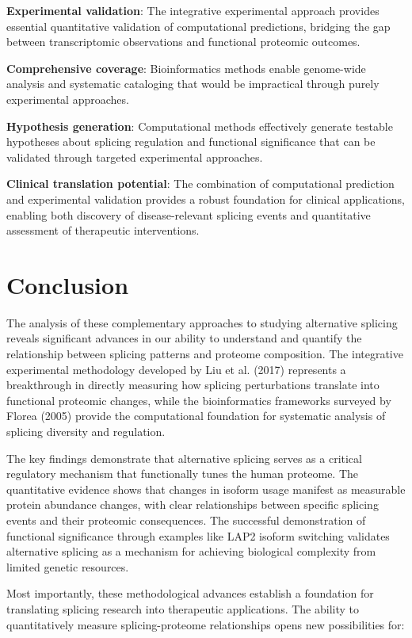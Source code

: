 \documentclass[12pt,a4paper]{article}
\begin{document}
\textbf{Experimental validation}: The integrative experimental approach provides essential quantitative validation of computational predictions, bridging the gap between transcriptomic observations and functional proteomic outcomes.

\textbf{Comprehensive coverage}: Bioinformatics methods enable genome-wide analysis and systematic cataloging that would be impractical through purely experimental approaches.

\textbf{Hypothesis generation}: Computational methods effectively generate testable hypotheses about splicing regulation and functional significance that can be validated through targeted experimental approaches.

\textbf{Clinical translation potential}: The combination of computational prediction and experimental validation provides a robust foundation for clinical applications, enabling both discovery of disease-relevant splicing events and quantitative assessment of therapeutic interventions.

\section{Conclusion}

The analysis of these complementary approaches to studying alternative splicing reveals significant advances in our ability to understand and quantify the relationship between splicing patterns and proteome composition. The integrative experimental methodology developed by Liu et al. (2017) represents a breakthrough in directly measuring how splicing perturbations translate into functional proteomic changes, while the bioinformatics frameworks surveyed by Florea (2005) provide the computational foundation for systematic analysis of splicing diversity and regulation.

The key findings demonstrate that alternative splicing serves as a critical regulatory mechanism that functionally tunes the human proteome. The quantitative evidence shows that changes in isoform usage manifest as measurable protein abundance changes, with clear relationships between specific splicing events and their proteomic consequences. The successful demonstration of functional significance through examples like LAP2 isoform switching validates alternative splicing as a mechanism for achieving biological complexity from limited genetic resources.

Most importantly, these methodological advances establish a foundation for translating splicing research into therapeutic applications. The ability to quantitatively measure splicing-proteome relationships opens new possibilities for:
\end{document}
